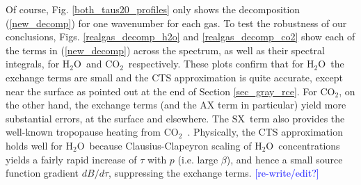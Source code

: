 \documentclass{ametsoc}
\newcommand{\beqn}{\begin{equation}}
\newcommand{\eeqn}{\end{equation}}
\newcommand{\n}{\nonumber}
\newcommand{\eqnref}[1]{(\ref{#1})}
\newcommand{\comment}[1]{\textcolor{blue}{[{#1}]}}
\newcommand{\ppp}{\ensuremath{\partial_p}}
\newcommand{\Cp}{\ensuremath{C_p}}
\newcommand{\cotwo}{\ensuremath{\mathrm{CO_2}}}
\newcommand{\htwo}{\ensuremath{\mathrm{H_2O}}}
\newcommand{\ch}{\ensuremath{\mathcal{H}}}
\newcommand{\chk}{\ensuremath{\ch_k}}
\newcommand{\SX}{\ensuremath{\mathrm{SX}}}
\newcommand{\CTS}{\ensuremath{\mathrm{CTS}}}
\begin{document}
Of course, Fig. \ref{both_taus20_profiles} only shows the decomposition \eqnref{new_decomp} for one wavenumber for each gas. To test the robustness of our conclusions, Figs. \ref{realgas_decomp_h2o} and \ref{realgas_decomp_co2} show each of the terms in \eqnref{new_decomp} across the spectrum, as well as their spectral integrals, for \htwo\ and \cotwo\ respectively. These plots confirm that for \htwo\ the exchange terms are small and the CTS approximation is quite accurate, except near the surface as pointed out at the end of Section \ref{sec_gray_rce}. For \cotwo, on the other hand, the exchange terms (and the AX term in particular) yield more substantial errors, at the surface and elsewhere. The \SX\ term also provides the well-known tropopause heating from \cotwo\ \citep[e.g.][]{thuburn2002,zhu1992}. Physically, the CTS approximation holds well for \htwo\ because Clausius-Clapeyron scaling of \htwo\ concentrations yields a fairly rapid increase of $\tau$ with $p$ (i.e. large $\beta$), and hence a small source function gradient $dB/d\tau$, suppressing the exchange terms. \comment{re-write/edit?}





 
\end{document}
